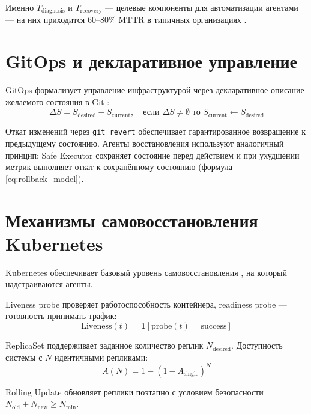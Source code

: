 Именно $T_{\text{diagnosis}}$ и $T_{\text{recovery}}$ --- целевые компоненты для автоматизации агентами --- на них приходится 60--80\% MTTR в типичных организациях \cite{continuous_deployment}.

\section{GitOps и декларативное управление}

GitOps формализует управление инфраструктурой через декларативное описание желаемого состояния в Git \cite{weaveworks_gitops}:
\begin{equation}
\Delta S = S_{\text{desired}} - S_{\text{current}}, \quad \text{если } \Delta S \neq \emptyset \text{ то } S_{\text{current}} \leftarrow S_{\text{desired}}
\label{eq:gitops}
\end{equation}

Откат изменений через \texttt{git revert} обеспечивает гарантированное возвращение к предыдущему состоянию. Агенты восстановления используют аналогичный принцип: Safe Executor сохраняет состояние перед действием и при ухудшении метрик выполняет откат к сохранённому состоянию (формула \ref{eq:rollback_model}).

\section{Механизмы самовосстановления Kubernetes}

Kubernetes обеспечивает базовый уровень самовосстановления \cite{burns_kubernetes,kubernetes_self_healing,kubernetes_docs,container_orchestration}, на который надстраиваются агенты.

Liveness probe проверяет работоспособность контейнера, readiness probe --- готовность принимать трафик:
\begin{equation}
\text{Liveness}(t) = \mathbf{1}[\text{probe}(t) = \text{success}]
\label{eq:liveness_probe}
\end{equation}

ReplicaSet поддерживает заданное количество реплик $N_{\text{desired}}$. Доступность системы с $N$ идентичными репликами:
\begin{equation}
A(N) = 1 - (1 - A_{\text{single}})^N
\label{eq:replica_availability}
\end{equation}

Rolling Update обновляет реплики поэтапно с условием безопасности $N_{\text{old}} + N_{\text{new}} \geq N_{\text{min}}$.

